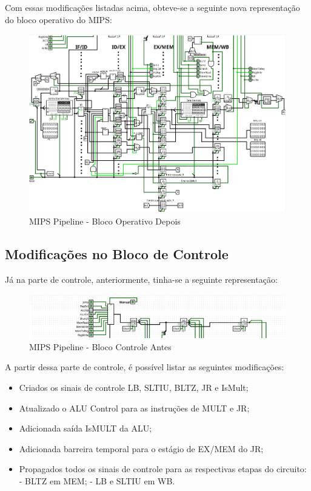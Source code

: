 \documentclass{report}
\begin{document}
        Com essas modificações listadas acima, obteve-se a seguinte nova representação do bloco operativo do MIPS:
        \begin{figure}[h!]
            \centering
            \includegraphics[width=\linewidth]{images/prints/Pipeline/Bloco Operativo Pipeline Depois.png}
            \caption{\label{print:pipeline_ob_after} MIPS Pipeline - Bloco Operativo Depois}
        \end{figure}

        \subsection{Modificações no Bloco de Controle}
        Já na parte de controle, anteriormente, tinha-se a seguinte representação:
        \begin{figure}[h!]
            \centering
            \includegraphics[width=\linewidth]{images/prints/Pipeline/Bloco de Controle Pipeline Antes.png}
            \caption{\label{print:pipeline_cb_before} MIPS Pipeline - Bloco Controle Antes}
        \end{figure}

        A partir dessa parte de controle, é possível listar as seguintes modificações:
        \begin{itemize}
            \item Criados os sinais de controle LB, SLTIU, BLTZ, JR e IsMult;
            \item Atualizado o ALU Control para as instruções de MULT e JR;
            \item Adicionada saída IsMULT da ALU;
            \item Adicionada barreira temporal para o estágio de EX/MEM do JR;
            \item Propagados todos os sinais de controle para as respectivas etapas do circuito:
                \subitem - BLTZ em MEM;
                \subitem - LB e SLTIU em WB.
        \end{itemize}
\end{document}
